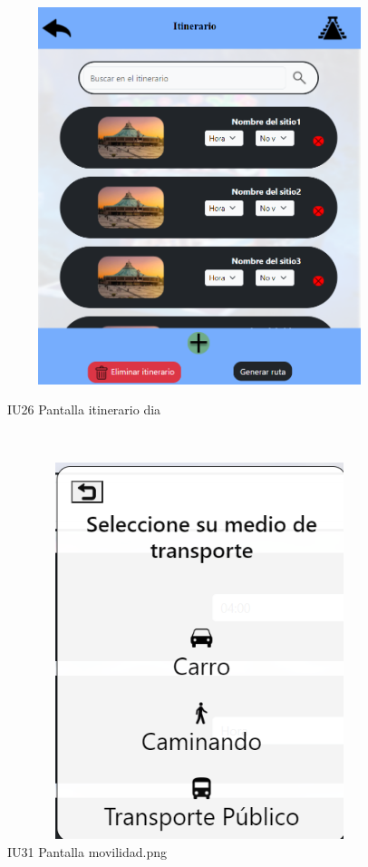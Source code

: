 \begin{figure}[htb]
        \begin{minipage}{1\textwidth}
        \centering
        \includegraphics[width=17cm, height=11cm]{front/PANTALLAS FUNCIONALES 3 DICIEMBRE/IU26_Pantalla itinerario dia.png}
        \caption{IU26 Pantalla itinerario dia}
    \end{minipage}%
    \\
        \begin{minipage}{1\textwidth}
        \centering
        \includegraphics[width=17cm, height=11cm]{front/PANTALLAS FUNCIONALES 3 DICIEMBRE/IU31_Pantalla movilidad.png}
        \caption{IU31 Pantalla movilidad.png}
    \end{minipage}%
\end{figure}

